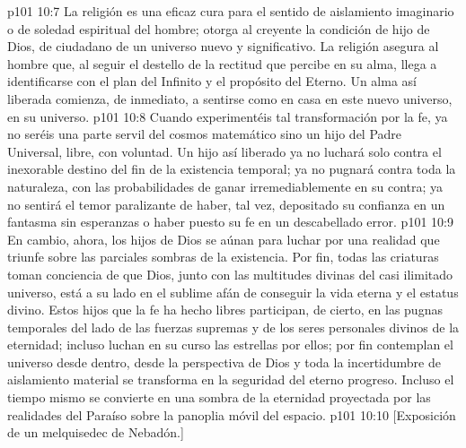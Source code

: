 \vs p101 10:7 La religión es una eficaz cura para el sentido de aislamiento imaginario o de soledad espiritual del hombre; otorga al creyente la condición de hijo de Dios, de ciudadano de un universo nuevo y significativo. La religión asegura al hombre que, al seguir el destello de la rectitud que percibe en su alma, llega a identificarse con el plan del Infinito y el propósito del Eterno. Un alma así liberada comienza, de inmediato, a sentirse como en casa en este nuevo universo, en su universo.
\vs p101 10:8 Cuando experimentéis tal transformación por la fe, ya no seréis una parte servil del cosmos matemático sino un hijo del Padre Universal, libre, con voluntad. Un hijo así liberado ya no luchará solo contra el inexorable destino del fin de la existencia temporal; ya no pugnará contra toda la naturaleza, con las probabilidades de ganar irremediablemente en su contra; ya no sentirá el temor paralizante de haber, tal vez, depositado su confianza en un fantasma sin esperanzas o haber puesto su fe en un descabellado error.
\vs p101 10:9 En cambio, ahora, los hijos de Dios se aúnan para luchar por una realidad que triunfe sobre las parciales sombras de la existencia. Por fin, todas las criaturas toman conciencia de que Dios, junto con las multitudes divinas del casi ilimitado universo, está a su lado en el sublime afán de conseguir la vida eterna y el estatus divino. Estos hijos que la fe ha hecho libres participan, de cierto, en las pugnas temporales del lado de las fuerzas supremas y de los seres personales divinos de la eternidad; incluso luchan en su curso las estrellas por ellos; por fin contemplan el universo desde dentro, desde la perspectiva de Dios y toda la incertidumbre de aislamiento material se transforma en la seguridad del eterno progreso. Incluso el tiempo mismo se convierte en una sombra de la eternidad proyectada por las realidades del Paraíso sobre la panoplia móvil del espacio.
\vsetoff
\vs p101 10:10 [Exposición de un melquisedec de Nebadón.]
